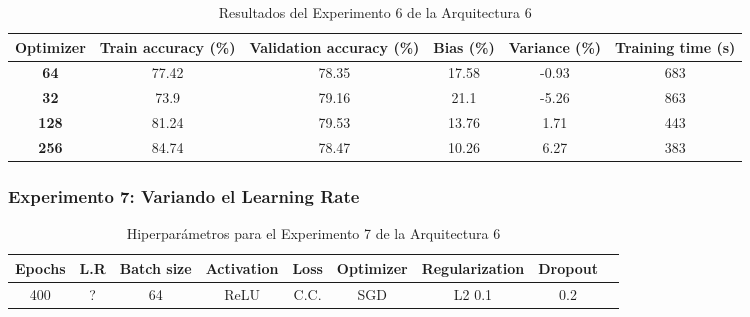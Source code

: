 \documentclass{article}
\begin{document}
    
   
   \begin{table}[!h]
				\begin{center}
					\begin{tabular}{ c | c | c | c | c | c |}
						 \textbf{Optimizer} & \textbf{Train accuracy (\%)} & \textbf{Validation accuracy (\%)} & \textbf{Bias (\%)} & \textbf{Variance (\%)} & \textbf{Training time (s)} \\ \hline
	
                        \textbf{64} &  77.42   &  78.35& 17.58 & -0.93 &   683  \\ \hline
                        \textbf{32} &  73.9    & 79.16& 21.1 & -5.26 &   863  \\ \hline
                        \textbf{128} &  81.24  &  79.53& 13.76 &  1.71  &   443   \\ \hline
                        \textbf{256} &  84.74 &  78.47 & 10.26 & 6.27 &   383    \\ \hline
					\end{tabular}
					\caption{Resultados del Experimento 6 de la Arquitectura 6}
					\label{tab:res-a2-e5}
				\end{center}
			\end{table}
   

    \subsubsection{Experimento 7: Variando el Learning Rate}

     \begin{table}[!h]
				\begin{tabular}{|c|c|c|c|c|c|c|c|c|}
					\textbf{Epochs}&\textbf{L.R}&\textbf{Batch size}&\textbf{Activation}&\textbf{Loss}&\textbf{Optimizer}&\textbf{Regularization}&\textbf{Dropout}   \\ \hline
					400 & ?  & 64 & ReLU & C.C. & SGD & L2 0.1 & 0.2 
				\end{tabular}
				\caption{Hiperpar\'ametros para el Experimento 7 de la Arquitectura 6}
				\label{tab:hip-a6-e2}
			\end{table}

    
   
\end{document}
